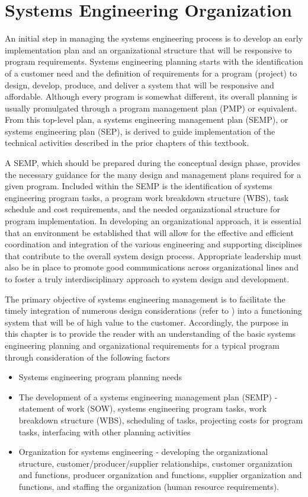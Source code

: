 \section{Systems Engineering Organization}

An initial step in managing the systems engineering process is to develop an early implementation plan and an organizational structure that will be responsive to program requirements. Systems engineering planning starts with the identification of a customer need and the definition of requirements for a program (project) to design, develop, produce, and deliver a system that will be responsive and affordable. Although every program is somewhat different, its overall planning is usually promulgated through a program management plan (PMP) or equivalent. From this top-level plan, a systems engineering management plan (SEMP), or systems engineering plan (SEP), is derived to guide implementation of the technical activities described in the prior chapters of this textbook.

A SEMP, which should be prepared during the conceptual design phase, provides the necessary guidance for the many design and management plans required for a given program. Included within the SEMP is the identification of systems engineering program tasks, a program work breakdown structure (WBS), task schedule and cost requirements, and the needed organizational structure for program implementation. In developing an organizational approach, it is essential that an environment be established that will allow for the effective and efficient coordination and integration of the various engineering and supporting disciplines that contribute to the overall system design process. Appropriate leadership must also be in place to promote good communications across organizational lines and to foster a truly interdisciplinary approach to system design and development.

The primary objective of systems engineering management is to facilitate the timely integration of numerous design considerations (refer to ) into a functioning system that will be of high value to the customer. Accordingly, the purpose in this chapter is to provide the reader with an understanding of the basic systems engineering planning and organizational requirements for a typical program through consideration of the following factors
\begin{itemize}
\item Systems engineering program planning needs
\item The development of a systems engineering management plan (SEMP) - statement of work (SOW), systems engineering program tasks, work breakdown structure (WBS), scheduling of tasks, projecting costs for program tasks, interfacing with other planning activities
\item Organization for systems engineering - developing the organizational structure, customer/producer/supplier relationships, customer organization and functions, producer organization and functions, supplier organization and functions, and staffing the organization (human resource requirements).
\end{itemize}

